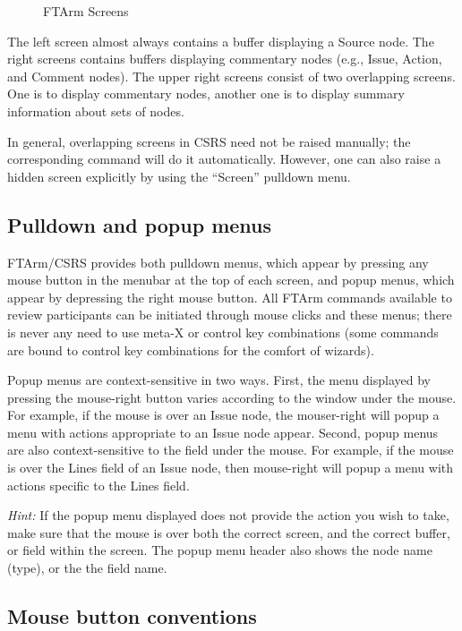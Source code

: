 \begin{figure}[htpb]
  {\centerline{}}
  \caption{FTArm Screens}
  \label{csrs-screen}
\end{figure}

The left screen almost always contains a buffer displaying a
Source node. The right screens contains buffers displaying commentary
nodes (e.g., Issue, Action, and Comment nodes). The upper right screens
consist of two overlapping screens. One is to display commentary nodes,
another one is to display summary information about sets of nodes.

In general, overlapping screens in CSRS need not be raised manually; the
corresponding command will do it automatically.
However, one can also raise a hidden screen explicitly by using
the ``Screen'' pulldown menu.

\subsection {Pulldown and popup menus}
FTArm/CSRS provides both pulldown menus, which appear by pressing any
mouse button in the menubar at the top of each screen, and popup
menus, 
which appear by depressing the right mouse button. All FTArm commands
available to review participants can be initiated through mouse clicks
and these menus; there is never any need to use meta-X or control key
combinations (some commands are bound to control key combinations for
the comfort of wizards).

Popup menus are context-sensitive in two ways. First, the menu
displayed by pressing the mouse-right button varies according to the
window under the mouse. For example, if the mouse is over an Issue
node, the mouser-right will popup a menu with actions appropriate to
an Issue node appear. Second, popup menus are also context-sensitive
to the field under the mouse. For example, if the mouse is over the
Lines field of an Issue node, then mouse-right will popup a menu with
actions specific to the Lines field.

{\it Hint:} If the popup menu displayed does not provide the action
you wish to take, make sure that the mouse is over both the correct
screen, and the correct buffer, or field within the screen. The
popup menu header also shows the node name (type), or the the field
name. 

\subsection {Mouse button conventions}

